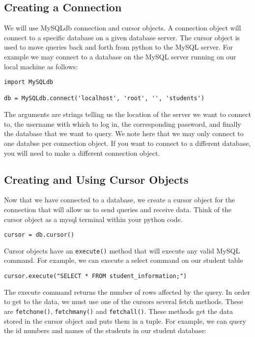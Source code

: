 \subsection{Creating a Connection}

We will use MySQLdb connection and cursor objects.  A connection object will connect to a specific database on a given database server.  The cursor object is used to move queries back and forth from python to the MySQL server.  For example we may connect to a database on the MySQL server running on our local machine as follows:

\begin{lstlisting}
import MySQLdb

db = MySQLdb.connect('localhost', 'root', '', 'students')

\end{lstlisting}

The arguments are strings telling us the location of the server we want to connect to, the username with which to log in, the corresponding password, and finally the database that we want to query.  We note here that we may only connect to one databse per connection object.  If you want to connect to a different database, you will need to make a different connection object.

\subsection{Creating and Using Cursor Objects}

Now that we have connected to a database, we create a cursor object for the connection that will allow us to send queries and receive data.  Think of the cursor object as a mysql terminal within your python code.

\begin{lstlisting}
cursor = db.cursor()

\end{lstlisting}

Cursor objects have an {\tt execute()} method that will execute any valid MySQL command.  For example, we can execute a select command on our student table

\begin{lstlisting}
cursor.execute("SELECT * FROM student_information;")

\end{lstlisting}

The execute command returns the number of rows affected by the query.  In order to get to the data, we must use one of the cursors several fetch methods.  These are {\tt fetchone()}, {\tt fetchmany()} and {\tt fetchall()}.  These methods get the data stored in the cursor object and puts them in a tuple.  For example, we can query the id numbers and names of the students in our student database:

